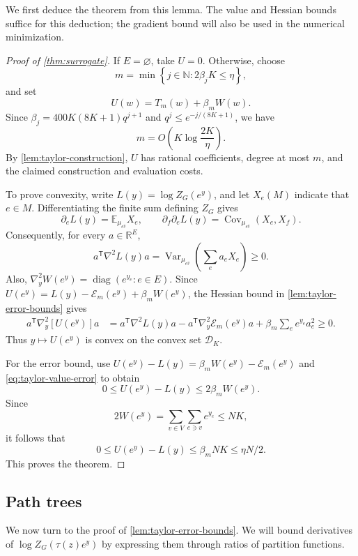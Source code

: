\documentclass[11pt,reqno,letterpaper]{amsart}
\numberwithin{equation}{section}
\theoremstyle{definition}
\theoremstyle{remark}
\newcommand{\R}{\mathbb R}
\newcommand{\E}{\mathbb E}
\newcommand{\cD}{\mathcal D}
\newcommand{\Var}{\operatorname{Var}}
\DeclareMathOperator{\diag}{diag}
\DeclareMathOperator{\Cov}{Cov}
\begin{document}
We first deduce the theorem from this lemma. The value and Hessian
bounds suffice for this deduction; the gradient bound will also be
used in the numerical minimization.

\begin{proof}[Proof of \cref{thm:surrogate}]
If $E=\varnothing$, take $U=0$. Otherwise, choose
\begin{equation}\label{eq:surrogate-degree}
 m=\min\left\{j\in\mathbb N:
       2\beta_jK\le\eta\right\},
\end{equation}
and set
\[
 U(w)=T_m(w)+\beta_mW(w).
\]
Since $\beta_j=400K(8K+1)q^{j+1}$ and
$q^j\le e^{-j/(8K+1)}$, we have
\[
 m=O\!\left(K\log\frac{2K}{\eta}\right).
\]
By \cref{lem:taylor-construction}, $U$ has rational coefficients,
degree at most $m$, and the claimed construction and evaluation costs.

To prove convexity, write $L(y)=\log Z_G(e^y)$, and let $X_e(M)$
indicate that $e\in M$. Differentiating the finite sum defining
$Z_G$ gives
\[
 \partial_e L(y)=\E_{\mu_{e^y}}X_e,
 \qquad
 \partial_f\partial_e L(y)=\Cov_{\mu_{e^y}}(X_e,X_f).
\]
Consequently, for every $a\in\R^E$,
\[
 a^{\mathsf T}\nabla^2L(y)a
 =\Var_{\mu_{e^y}}\!\left(\sum_e a_eX_e\right)\ge0.
\]
Also, $\nabla_y^2W(e^y)=\diag(e^{y_e}:e\in E)$. Since
$U(e^y)=L(y)-\mathcal E_m(e^y)+\beta_mW(e^y)$, the Hessian bound
in \cref{lem:taylor-error-bounds} gives
\begin{align*}
 a^{\mathsf T}\nabla_y^2[U(e^y)]a
 &=a^{\mathsf T}\nabla^2L(y)a
   -a^{\mathsf T}\nabla_y^2\mathcal E_m(e^y)a
   +\beta_m\sum_e e^{y_e}a_e^2
 \ge0.
\end{align*}
Thus $y\mapsto U(e^y)$ is convex on the convex set $\cD_K$.

For the error bound, use
$U(e^y)-L(y)=\beta_mW(e^y)-\mathcal E_m(e^y)$
and \cref{eq:taylor-value-error} to obtain
\[
 0\le U(e^y)-L(y)\le2\beta_mW(e^y).
\]
Since
\[
 2W(e^y)=\sum_{v\in V}\sum_{e\ni v}e^{y_e}\le NK,
\]
it follows that
\[
 0\le U(e^y)-L(y)\le\beta_mNK\le\eta N/2.
\]
This proves the theorem.
\end{proof}

\subsection{Path trees}

We now turn to the proof of \cref{lem:taylor-error-bounds}. We will bound
derivatives of $\log Z_G(\tau(z)e^y)$ by expressing them through
ratios of partition functions.
\end{document}
